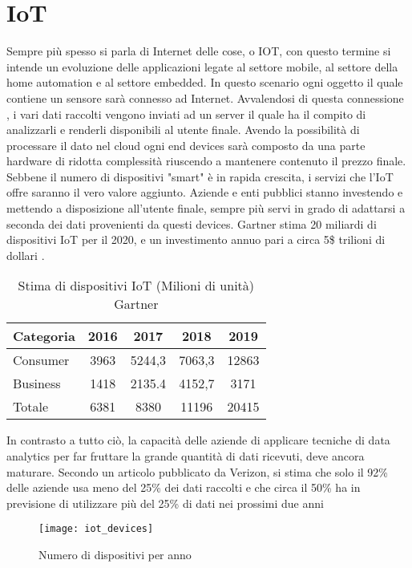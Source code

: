 \chapter{IoT}
Sempre più spesso si parla di Internet delle cose, o IOT, con questo termine si
intende un evoluzione delle applicazioni legate al settore mobile, al settore
della home automation e al settore embedded.  In questo scenario ogni oggetto il
quale contiene un sensore sarà connesso ad Internet. 
Avvalendosi di questa
connessione , i vari dati raccolti vengono inviati ad un server il quale ha il
compito di analizzarli e renderli disponibili al utente finale.  Avendo la
possibilità di processare il dato nel cloud ogni end devices sarà composto da
una parte  hardware di ridotta complessità riuscendo a mantenere contenuto il
prezzo finale. 
Sebbene il numero di dispositivi "smart" è in rapida crescita, i servizi che
l'IoT offre saranno il vero valore aggiunto. Aziende e enti pubblici stanno
investendo e mettendo a disposizione all'utente finale, sempre più servi in
grado di adattarsi a seconda dei dati provenienti da questi devices.  Gartner
stima  20 miliardi di dispositivi IoT per il 2020, e un investimento annuo pari
a circa 5\$ trilioni di dollari \cite{gartner2016}. 

\begin{table}[h]
        \centering
        \begin{tabular}{l|c|c|c|c}
                Categoria  & 2016 & 2017 & 2018 & 2019 \\
                \hline
                Consumer  & 3963 & 5244,3 & 7063,3 & 12863 \\
                Business  & 1418 & 2135.4 & 4152,7 & 3171  \\
                Totale    & 6381 & 8380   & 11196  & 20415 \\
        \end{tabular}
        \caption{Stima di dispositivi IoT (Milioni di unità) Gartner\cite{gartner2016}}
\end{table}

In contrasto a tutto ciò, la capacità delle aziende di applicare tecniche di
data analytics per far fruttare la grande quantità di dati ricevuti, deve ancora
maturare. Secondo un articolo pubblicato da Verizon, si stima che solo il 92\% delle
aziende usa meno del 25\% dei dati raccolti e che circa il 50\% ha in previsione
di utilizzare più del 25\% di dati nei prossimi due anni \cite{VerizionIoT}

\begin{figure}[h]
        \centering 
                \texttt{[image: iot\_devices]}
        \caption{Numero di dispositivi per anno}
\end{figure}

